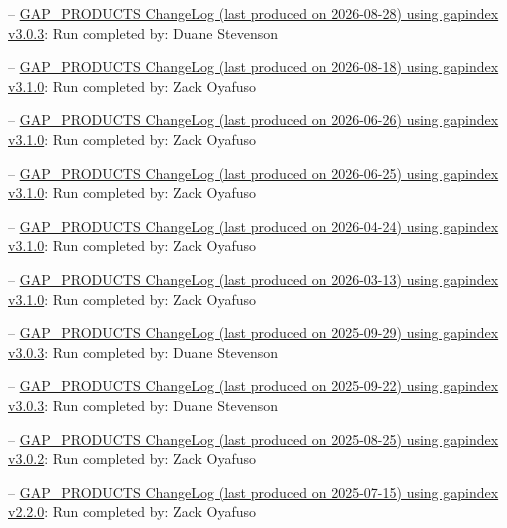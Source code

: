 \documentclass[
  letterpaper,
  oneside,
  open=any]{scrbook}
\begin{document}
--
\href{https://raw.githubusercontent.com/afsc-gap-products/gap_products/main/content/intro-news/2026-08-28.txt}{GAP\_PRODUCTS
ChangeLog (last produced on 2026-08-28) using gapindex v3.0.3}: Run
completed by: Duane Stevenson

--
\href{https://raw.githubusercontent.com/afsc-gap-products/gap_products/main/content/intro-news/2026-08-18.txt}{GAP\_PRODUCTS
ChangeLog (last produced on 2026-08-18) using gapindex v3.1.0}: Run
completed by: Zack Oyafuso

--
\href{https://raw.githubusercontent.com/afsc-gap-products/gap_products/main/content/intro-news/2026-06-26.txt}{GAP\_PRODUCTS
ChangeLog (last produced on 2026-06-26) using gapindex v3.1.0}: Run
completed by: Zack Oyafuso

--
\href{https://raw.githubusercontent.com/afsc-gap-products/gap_products/main/content/intro-news/2026-06-25.txt}{GAP\_PRODUCTS
ChangeLog (last produced on 2026-06-25) using gapindex v3.1.0}: Run
completed by: Zack Oyafuso

--
\href{https://raw.githubusercontent.com/afsc-gap-products/gap_products/main/content/intro-news/2026-04-24.txt}{GAP\_PRODUCTS
ChangeLog (last produced on 2026-04-24) using gapindex v3.1.0}: Run
completed by: Zack Oyafuso

--
\href{https://raw.githubusercontent.com/afsc-gap-products/gap_products/main/content/intro-news/2026-03-13.txt}{GAP\_PRODUCTS
ChangeLog (last produced on 2026-03-13) using gapindex v3.1.0}: Run
completed by: Zack Oyafuso

--
\href{https://raw.githubusercontent.com/afsc-gap-products/gap_products/main/content/intro-news/2025-09-29.txt}{GAP\_PRODUCTS
ChangeLog (last produced on 2025-09-29) using gapindex v3.0.3}: Run
completed by: Duane Stevenson

--
\href{https://raw.githubusercontent.com/afsc-gap-products/gap_products/main/content/intro-news/2025-09-22.txt}{GAP\_PRODUCTS
ChangeLog (last produced on 2025-09-22) using gapindex v3.0.3}: Run
completed by: Duane Stevenson

--
\href{https://raw.githubusercontent.com/afsc-gap-products/gap_products/main/content/intro-news/2025-08-25.txt}{GAP\_PRODUCTS
ChangeLog (last produced on 2025-08-25) using gapindex v3.0.2}: Run
completed by: Zack Oyafuso

--
\href{https://raw.githubusercontent.com/afsc-gap-products/gap_products/main/content/intro-news/2025-07-15.txt}{GAP\_PRODUCTS
ChangeLog (last produced on 2025-07-15) using gapindex v2.2.0}: Run
completed by: Zack Oyafuso
\end{document}
